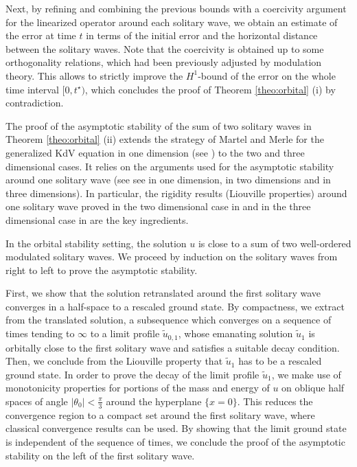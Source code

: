 \documentclass[reqno,10pt]{amsart}
\numberwithin{equation}{section}
\begin{document}
Next, by refining and combining the previous bounds with a coercivity argument for the linearized operator around each solitary wave, we obtain an estimate of the error at time $t$ in terms of the initial error and the horizontal distance between the solitary waves. Note that the coercivity is obtained up to some orthogonality relations, which had been previously  adjusted by modulation theory. This allows to strictly improve the $H^1$-bound of the error on the whole time interval $[0,t^{\star})$, which concludes the proof of Theorem \ref{theo:orbital} (i) by contradiction.

\smallskip

The proof of the asymptotic stability of the sum of two solitary waves in Theorem \ref{theo:orbital} (ii) extends the strategy of Martel and Merle for the generalized KdV equation in one dimension (see \cite{MMT02,MM08}) to the two and three dimensional cases. It relies on the arguments used for the asymptotic stability around one solitary wave (see see \cite{MM01,MM05,MM08} in one dimension, \cite{CMPS16} in two dimensions and \cite{FHRY23} in three dimensions). In particular, the rigidity results (Liouville properties) around one solitary wave proved in the two dimensional case in \cite{CMPS16} and in the three dimensional case in \cite{FHRY23} are the key ingredients. 

In the orbital stability setting, the solution $u$ is close to a sum of two well-ordered  modulated solitary waves. We proceed by induction on the solitary waves from right to left to prove the asymptotic stability. 

First, we show that the solution retranslated around the first solitary wave converges in a half-space to a rescaled ground state. By compactness, we extract from the translated solution, a subsequence which converges on a sequence of times tending to $\infty$ to a limit profile $\tilde{u}_{0,1}$, whose emanating solution $\tilde{u}_1$ is orbitally close to the first solitary wave and satisfies a suitable decay condition. Then, we conclude from the Liouville property that $\tilde{u}_1$ has to be a rescaled ground state. In order to prove the decay of the limit profile $\tilde{u}_1$, we make use of monotonicity properties for portions of the mass and energy of $u$ on oblique half spaces of angle $\vert \theta_0 \vert < \frac{\pi}{3}$ around the hyperplane $\{x=0\}$. This reduces the convergence region to a compact set around the first solitary wave, where classical convergence results can be used. By showing that the limit ground state is independent of the sequence of times, we conclude the proof of the asymptotic stability on the left of the first solitary wave.
\end{document}
